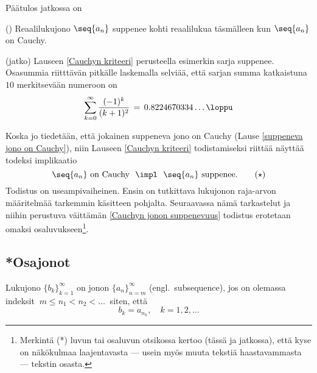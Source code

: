 Päätulos jatkossa on
\begin{*Lause} \label{Cauchyn kriteeri} 
 ()
Reaalilukujono $\seq{a_n}$ suppenee kohti reaalilukua täsmälleen kun $\seq{a_n}$ on Cauchy. 
\end{*Lause}
\jatko\jatko \begin{Exa} (jatko) Lauseen \ref{Cauchyn kriteeri} perusteella esimerkin
sarja suppenee. Osasummia riitttävän pitkälle laskemalla selviää, että sarjan summa katkaistuna
$10$ merkitsevään numeroon on
\[
\sum_{k=0}^\infty \frac{(-1)^k}{(k+1)^2} \,=\, 0.8224670334\ldots \loppu
\]
\end{Exa} \seur
Koska jo tiedetään, että jokainen suppeneva jono on Cauchy (Lause 
\ref{suppeneva jono on Cauchy}), niin Lauseen \ref{Cauchyn kriteeri} todistamiseksi riittää
näyttää todeksi implikaatio
\begin{equation} \label{Cauchyn jonon suppenevuus}
\seq{a_n}\ \text{on Cauchy}\ \ \impl\ \ \seq{a_n}\ \text{suppenee}. \tag{$\star$}
\end{equation}
Todistus on useampivaiheinen. Ensin on tutkittava lukujonon raja-arvon määritelmää
tarkemmin  käsitteen pohjalta. Seuraavassa nämä tarkastelut ja niihin perustuva
väittämän \eqref{Cauchyn jonon suppenevuus} todistus erotetaan omaksi 
osaluvukseen\footnote[2]{Merkintä (*) luvun tai osaluvun otsikossa kertoo 
(tässä ja jatkossa), että kyse on näkökulmaa laajentavasta --- usein myös muuta tekstiä 
haastavammasta --- tekstin osasta.}.

\subsection{*Osajonot}

\begin{Def}   
Lukujono $\{b_k\}_{k=1}^{\infty}$ on jonon $\{a_n\}_{n=m}^{\infty}$ 
(engl.\ subsequence), jos on olemassa indeksit $\ m \le n_1 < n_2 < \ldots\ $ siten, että
\[
b_k = a_{n_k}, \quad k = 1,2, \ldots
\]  \end{Def}

